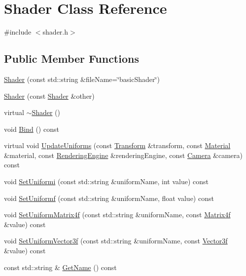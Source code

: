 \hypertarget{class_shader}{}\section{Shader Class Reference}
\label{class_shader}


{\ttfamily \#include $<$shader.\+h$>$}

\subsection*{Public Member Functions}
\begin{DoxyCompactItemize}
\item 
\hyperlink{class_shader_aa77ff87040a96fc59c281a4db18779ac}{Shader} (const std\+::string \&file\+Name=\char`\"{}basic\+Shader\char`\"{})
\item 
\hyperlink{class_shader_adab8e450ec1f4509c1bdf147e47a871c}{Shader} (const \hyperlink{class_shader}{Shader} \&other)
\item 
virtual \hyperlink{class_shader_aff01df87e8a102f270b5b135a295e59d}{$\sim$\+Shader} ()
\item 
void \hyperlink{class_shader_a80b52feb71b870447cd0f2a20ca68400}{Bind} () const 
\item 
virtual void \hyperlink{class_shader_a0a6b91d25a352e72624a26cb05f21962}{Update\+Uniforms} (const \hyperlink{class_transform}{Transform} \&transform, const \hyperlink{class_material}{Material} \&material, const \hyperlink{class_rendering_engine}{Rendering\+Engine} \&rendering\+Engine, const \hyperlink{class_camera}{Camera} \&camera) const 
\item 
void \hyperlink{class_shader_a1215713a36b12d48c1c94b56c889c269}{Set\+Uniformi} (const std\+::string \&uniform\+Name, int value) const 
\item 
void \hyperlink{class_shader_aad923978e650300bfe1f82e6ec132fc3}{Set\+Uniformf} (const std\+::string \&uniform\+Name, float value) const 
\item 
void \hyperlink{class_shader_a7633ff5ad50e12c6e8a86d4914d73335}{Set\+Uniform\+Matrix4f} (const std\+::string \&uniform\+Name, const \hyperlink{math3d_8h_a5b7721ab7216c91a40538beaa9e6ee1f}{Matrix4f} \&value) const 
\item 
void \hyperlink{class_shader_aab04027c10b4d5abe5a0095713471c37}{Set\+Uniform\+Vector3f} (const std\+::string \&uniform\+Name, const \hyperlink{class_vector3f}{Vector3f} \&value) const 
\item 
const std\+::string \& \hyperlink{class_shader_a809d60fe373e488a764dc80ac8158330}{Get\+Name} () const 
\end{DoxyCompactItemize}


